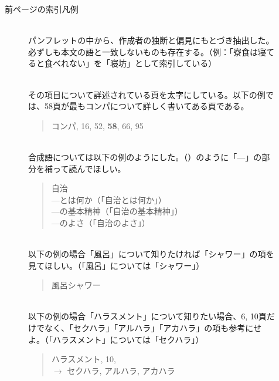 
  {\large 前ページの索引凡例}
  
  
  \begin{figure}[H]
    \begin{minipage}[t]{.48\textwidth}
      \small
      \\
      パンフレットの中から、作成者の独断と偏見にもとづき抽出した。必ずしも本文の語と一致しないものも存在する。（例：「寮食は寝てると食べれない」を「寝坊」として索引している）

      \\
      その項目について詳述されている頁を太字にしている。以下の例では、58頁が最もコンパについて詳しく書いてある頁である。
      \begin{quote}
        コンパ, 16, 52, \textbf{58}, 66, 95
      \end{quote}

      \\
      合成語については以下の例のようにした。（）のように「---」の部分を補って読んでほしい。
      \begin{quote}
        自治\\
        \qquad ---とは何か（「自治とは何か」）\\
        \qquad ---の基本精神（「自治の基本精神」）\\
        \qquad ---のよさ（「自治のよさ」）\\
      \end{quote}
    \end{minipage}
    \hfill
    \begin{minipage}[t]{.48\textwidth}
      \small
      \\
      以下の例の場合「風呂」について知りたければ「シャワー」の項を見てほしい。（「風呂」については「シャワー」）
      \begin{quote}
        風呂\dotfill シャワー
      \end{quote}
    
      \\
      以下の例の場合「ハラスメント」について知りたい場合、6, 10頁だけでなく、「セクハラ」「アルハラ」「アカハラ」の項も参考にせよ。（「ハラスメント」については「セクハラ」）
      \begin{quote}
        ハラスメント, 10,\\
        \qquad $\longrightarrow$ セクハラ, アルハラ, アカハラ
      \end{quote}
    \end{minipage}
  \end{figure}
  

